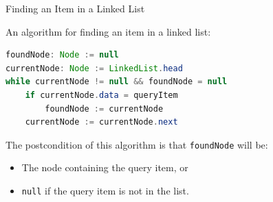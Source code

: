 \documentclass{beamer}
\begin{document}
\begin{frame}[fragile]{Finding an Item in a Linked List}


An algorithm for finding an item in a linked list:
\begin{lstlisting}[language=Java]
foundNode: Node := null
currentNode: Node := LinkedList.head
while currentNode != null && foundNode = null
    if currentNode.data = queryItem
        foundNode := currentNode
    currentNode := currentNode.next
\end{lstlisting}

The postcondition of this algorithm is that {\tt foundNode} will be:

\begin{itemize}
\item The node containing the query item, or
\item {\tt null} if the query item is not in the list.
\end{itemize}


\end{frame}
\end{document}
